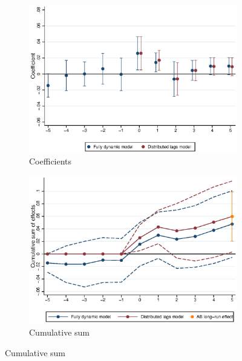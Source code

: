\begin{figure}[htb!]
	\caption{The Dynamic Effects of MW Changes on Rents}
	\label{fig:dynamic_models_main}
	\centering
	\begin{subfigure}[b]{0.7\textwidth}
		\caption{Coefficients}
		\label{fig:dynamic_model_coeffs}
		\includegraphics[width = \textwidth]
		{../../analysis/first_differences/output/fd_models_coeffs_w5.eps}
	\end{subfigure}
	\begin{subfigure}[b]{0.7\textwidth}
		\caption{Cumulative sum}
		\label{fig:dynamic_model_cumsum}
		\includegraphics[width = \textwidth]
		{../../analysis/first_differences/output/fd_models_cumsum.eps}
	\end{subfigure}
	\begin{minipage}{0.95\textwidth} \footnotesize

\end{minipage}
\end{figure}
